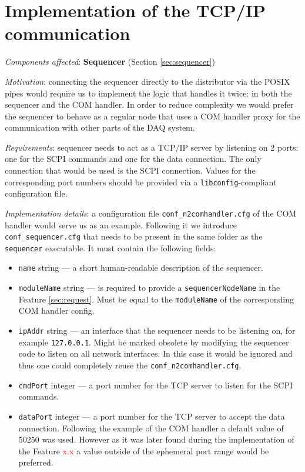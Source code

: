 \section{Implementation of the TCP/IP communication}
\label{sec:tcp_ip_sequencer}

\textit{Components affected}: \textbf{Sequencer} (Section \ref{sec:sequencer})

\textit{Motivation}: connecting the sequencer directly to the distributor via the POSIX pipes would require us to implement the logic that handles it twice: in both the sequencer and the COM handler. In order to reduce complexity we would prefer the sequencer to behave as a regular node that uses a COM handler proxy for the communication with other parts of the DAQ system.

\textit{Requirements}: sequencer needs to act as a TCP/IP server by listening on 2 ports: one for the SCPI commands and one for the data connection. The only connection that would be used is the SCPI connection. Values for the corresponding port numbers should be provided via a \texttt{libconfig}-compliant configuration file.

\textit{Implementation details}: a configuration file \texttt{conf\_n2comhandler.cfg} of the COM handler would serve us as an example. Following it we introduce \texttt{conf\_sequencer.cfg} that needs to be present in the same folder as the \texttt{sequencer} executable. It must contain the following fields:

\begin{itemize}
	\item \texttt{name} string --- a short human-readable description of the sequencer.
	\item \texttt{moduleName} string --- is required to provide a \texttt{sequencerNodeName} in the Feature \ref{sec:request}. Must be equal to the \texttt{moduleName} of the corresponding COM handler config.
	\item \texttt{ipAddr} string --- an interface that the sequencer needs to be listening on, for example \texttt{127.0.0.1}. Might be marked obsolete by modifying the sequencer code to listen on all network interfaces. In this case it would be ignored and thus one could completely reuse the \texttt{conf\_n2comhandler.cfg}.
	\item \texttt{cmdPort} integer --- a port number for the TCP server to listen for the SCPI commands.
	\item \texttt{dataPort} integer --- a port number for the TCP server to accept the data connection. Following the example of the COM handler a default value of 50250 was used. However as it was later found during the implementation of the Feature \textcolor{red}{x.x} a value outside of the ephemeral port range would be preferred.
\end{itemize}

